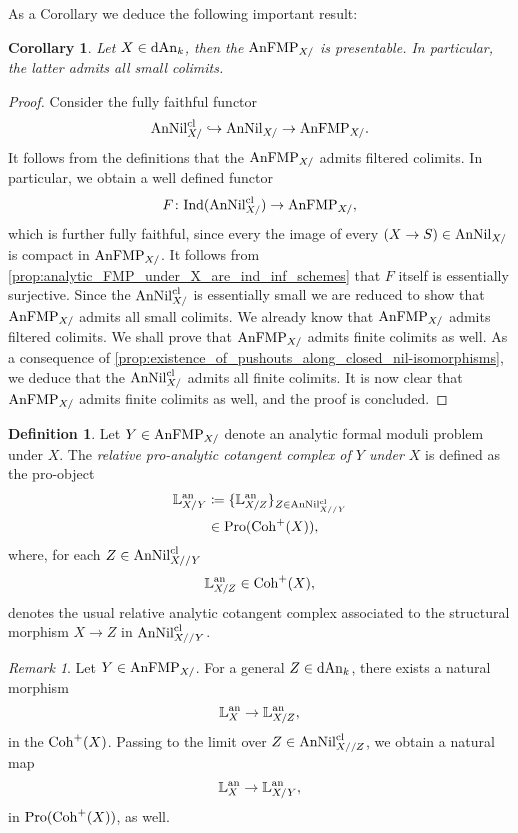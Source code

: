 \documentclass[10pt,a4paper,reqno]{amsart} %
\theoremstyle{plain}
\newtheorem{cor}[thm]{Corollary}
\theoremstyle{definition}
\newtheorem{defin}[thm]{Definition}
\theoremstyle{remark}
\newtheorem{rem}[thm]{Remark}
\numberwithin{equation}{section}
\begin{document}
As a Corollary we deduce the following important result:

\begin{cor}
    Let $X \in \mathrm{dAn}_k$, then the \infcat $\mathrm{AnFMP}_{X/ }$ is presentable. In particular, the latter admits all small colimits.
\end{cor}

\begin{proof} Consider the fully faithful functor
        \[
            \mathrm{AnNil}_{X/ }^{\mathrm{cl}} \hookrightarrow \mathrm{AnNil}_{X/ } \to \mathrm{AnFMP}_{X/ }.
        \]
    It follows from the definitions that the \infcat $\mathrm{AnFMP}_{X/ }$ admits filtered colimits. In particular, we obtain
    a well defined functor
        \[
            F \colon \mathrm{Ind}(\mathrm{AnNil}_{X/ } ^{\mathrm{cl}}) \to \mathrm{AnFMP}_{X/ },
        \]
    which is further fully faithful, since every the image of every $(X \to S) \in \mathrm{AnNil}_{X/ }$ is compact in $\mathrm{AnFMP}_{X/ }$.
    It follows from \cref{prop:analytic_FMP_under_X_are_ind_inf_schemes} that $F$ itself is essentially surjective. Since the
    \infcat $\mathrm{AnNil}_{X/ }^{\mathrm{cl}}$ is essentially small we are reduced to show that $\mathrm{AnFMP}_{X/ }$ admits all small colimits. 
    We already know that $\mathrm{AnFMP}_{X/ }$ admits filtered colimits. We shall prove that $\mathrm{AnFMP}_{X/ }$ admits finite colimits as well.
    As a consequence of \cref{prop:existence_of_pushouts_along_closed_nil-isomorphisms}, we deduce that
    the \infcat $\mathrm{AnNil}_{X/ }^{\mathrm{cl}}$ admits all finite colimits. It is now clear that $\mathrm{AnFMP}_{X/ }$ admits finite colimits as well,
    and the proof is concluded.
\end{proof}


\begin{defin}
    Let $Y \in \mathrm{AnFMP}_{X/}$ denote an analytic formal moduli problem under $X$. The \emph{relative pro-analytic cotangent complex of $Y$ under $X$} is defined as the pro-object
        \begin{align*}
            \mathbb L^\mathrm{an}_{X/Y} &  \coloneqq \{ \mathbb L^\mathrm{an}_{X/Z} \}_{Z \in \mathrm{AnNil}^{\mathrm{cl}}_{X//Y}} \\
                          &  \in \mathrm{Pro}(\mathrm{Coh}^+(X)),
        \end{align*}
    where, for each $Z \in \mathrm{AnNil}^{\mathrm{cl}}_{X//Y}$
        \[\mathbb L^\mathrm{an}_{X/Z} \in \mathrm{Coh}^+(X),\]
    denotes the usual relative analytic cotangent complex associated to
    the structural morphism $X \to Z$ in $\mathrm{AnNil}^{\mathrm{cl}}_{X//Y}$.
\end{defin}


\begin{rem}
    Let $Y \in \mathrm{AnFMP}_{X/}$. For a general $Z \in \mathrm{dAn}_k$, there exists a natural morphism
        \[
            \mathbb L^\mathrm{an}_X \to \mathbb L^\mathrm{an}_{X/Z} ,  
        \]
    in the \infcat $\mathrm{Coh}^+(X)$. Passing to the limit over $Z \in \mathrm{AnNil}^{\mathrm{cl}}_{X//Z}$, we obtain a natural map
        \[
            \mathbb L^\mathrm{an}_X \to \mathbb L^\mathrm{an}_{X/Y},  
        \]
    in $\mathrm{Pro}(\mathrm{Coh}^+(X))$, as well.
\end{rem}
\end{document}
